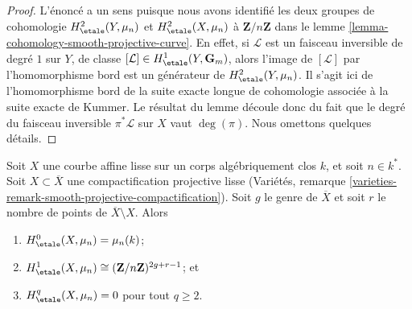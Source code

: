 \begin{proof}
L'énoncé a un sens puisque nous avons identifié les deux
groupes de cohomologie $ H^2_\etale(Y, \mu_n)$ et $H^2_\etale(X, \mu_n)$
à $\mathbf{Z}/n\mathbf{Z}$ dans le
lemme \ref{lemma-cohomology-smooth-projective-curve}.
En effet, si $\mathcal{L}$ est un faisceau inversible de degré $1$
sur $Y$, de classe $[\mathcal{L}] \in H^1_\etale(Y, \mathbf{G}_m)$,
alors l'image de $[\mathcal{L}]$ par l'homomorphisme bord est un générateur de
$H^2_\etale(Y, \mu_n)$. Il s'agit ici de l'homomorphisme bord
de la suite exacte longue de cohomologie associée à la suite exacte
de Kummer. Le résultat du lemme découle donc du fait que
le degré du faisceau inversible $\pi^*\mathcal{L}$ sur $X$ vaut $\deg(\pi)$.
Nous omettons quelques détails.
\end{proof}

\begin{lemma}
\label{lemma-vanishing-cohomology-mu-smooth-curve}
Soit $X$ une courbe affine lisse sur un corps algébriquement clos $k$, et
soit $n \in k^*$. Soit $X \subset \overline{X}$ une
compactification projective lisse
(Variétés, remarque \ref{varieties-remark-smooth-projective-compactification}).
Soit $g$ le genre de $\overline{X}$ et soit $r$ le nombre de
points de $\overline{X} \setminus X$. Alors
\begin{enumerate}
\item $H_\etale^0(X, \mu_n) = \mu_n(k)$;
\item $H_\etale^1(X, \mu_n) \cong (\mathbf{Z}/n\mathbf{Z})^{2g+r-1}$; et
\item $H_\etale^q(X, \mu_n) = 0$ pour tout $q \geq 2$.
\end{enumerate}
\end{lemma}

